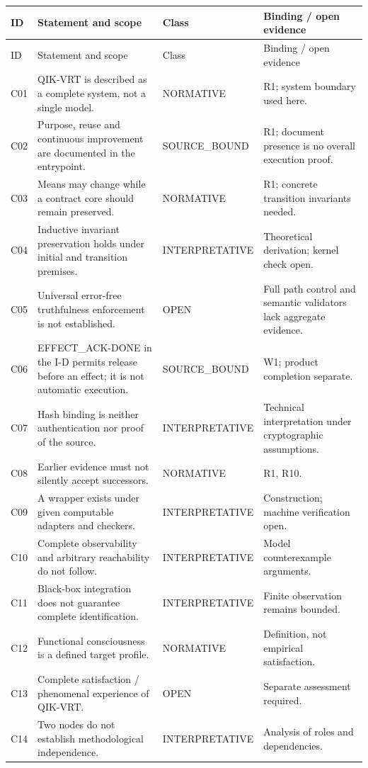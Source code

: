 {\tighttable
\begin{longtable}{@{}p{11mm}p{66mm}p{25mm}p{52mm}@{}}\toprule
ID & Statement and scope & Class & Binding / open evidence\\\midrule\endfirsthead\toprule ID & Statement and scope & Class & Binding / open evidence\\\midrule\endhead
C01 & QIK-VRT is described as a complete system, not a single model. & NORMATIVE & R1; system boundary used here.\\
C02 & Purpose, reuse and continuous improvement are documented in the entrypoint. & SOURCE\_BOUND & R1; document presence is no overall execution proof.\\
C03 & Means may change while a contract core should remain preserved. & NORMATIVE & R1; concrete transition invariants needed.\\
C04 & Inductive invariant preservation holds under initial and transition premises. & INTERPRETATIVE & Theoretical derivation; kernel check open.\\
C05 & Universal error-free truthfulness enforcement is not established. & OPEN & Full path control and semantic validators lack aggregate evidence.\\
C06 & EFFECT\_ACK-DONE in the I-D permits release before an effect; it is not automatic execution. & SOURCE\_BOUND & W1; product completion separate.\\
C07 & Hash binding is neither authentication nor proof of the source. & INTERPRETATIVE & Technical interpretation under cryptographic assumptions.\\
C08 & Earlier evidence must not silently accept successors. & NORMATIVE & R1, R10.\\
C09 & A wrapper exists under given computable adapters and checkers. & INTERPRETATIVE & Construction; machine verification open.\\
C10 & Complete observability and arbitrary reachability do not follow. & INTERPRETATIVE & Model counterexample arguments.\\
C11 & Black-box integration does not guarantee complete identification. & INTERPRETATIVE & Finite observation remains bounded.\\
C12 & Functional consciousness is a defined target profile. & NORMATIVE & Definition, not empirical satisfaction.\\
C13 & Complete satisfaction / phenomenal experience of QIK-VRT. & OPEN & Separate assessment required.\\
C14 & Two nodes do not establish methodological independence. & INTERPRETATIVE & Analysis of roles and dependencies.\\

\end{longtable}}
